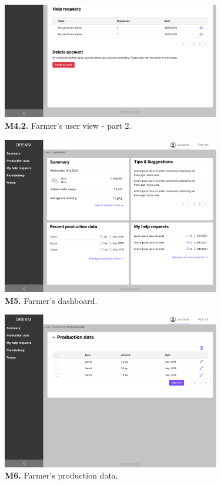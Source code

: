 \begin{figure}[H]
    \centering
    \includegraphics[width=0.85\textwidth]{mockups/Farmer_User_part2.png}
    \caption{\textbf{M4.2.} Farmer's user view - part 2.}
\end{figure}

\begin{figure}[H]
    \centering
    \includegraphics[width=0.85\textwidth]{mockups/Farmer_Dashboard.png}
    \caption{\textbf{M5.} Farmer's dashboard.}
\end{figure}

\begin{figure}[H]
    \centering
    \includegraphics[width=0.85\textwidth]{mockups/Farmer_Dashboard_Production data.png}
    \caption{\textbf{M6.} Farmer's production data.}
\end{figure}

